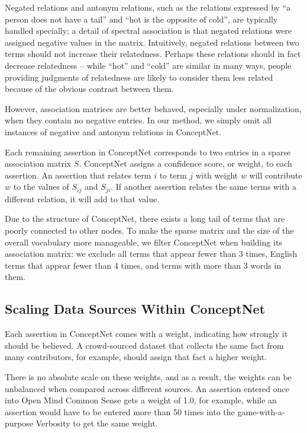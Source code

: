 \documentclass[letterpaper]{article}
\begin{document}
Negated relations and antonym relations, such as the relations expressed by
``a person does not have a tail'' and ``hot is the opposite of cold'', are
typically handled specially; a detail of spectral association is that negated
relations were assigned negative values in the matrix. Intuitively, negated
relations between two terms should not increase their relatedness. Perhaps
these relations should in fact decrease relatedness -- while ``hot'' and
``cold'' are similar in many ways, people providing judgments of relatedness
are likely to consider them less related because of the obvious contrast
between them.

However, association matrices are better behaved, especially under
normalization, when they contain no negative entries. In our method, we simply
omit all instances of negative and antonym relations in ConceptNet.

Each remaining assertion in ConceptNet corresponds to two entries in a sparse
association matrix $S$. ConceptNet assigns a confidence score, or weight, to
each assertion. An assertion that relates term $i$ to term $j$ with weight $w$
will contribute $w$ to the values of $S_{ij}$ and $S_{ji}$. If another
assertion relates the same terms with a different relation, it will add to that
value.

Due to the structure of ConceptNet, there exists a long tail of terms that are
poorly connected to other nodes. To make the sparse matrix and the size of the
overall vocabulary more manageable, we filter ConceptNet when building its
association matrix: we exclude all terms that appear fewer than 3 times, English
terms that appear fewer than 4 times, and terms with more than 3 words in them.

\subsection{Scaling Data Sources Within ConceptNet}

Each assertion in ConceptNet comes with a weight, indicating how strongly it
should be believed. A crowd-sourced dataset that collects the same fact from
many contributors, for example, should assign that fact a higher weight.

There is no absolute scale on these weights, and as a result, the weights can
be unbalanced when compared across different sources. An assertion entered once
into Open Mind Common Sense gets a weight of 1.0, for example, while an
assertion would have to be entered more than 50 times into the
game-with-a-purpose Verbosity to get the same weight.
\end{document}
